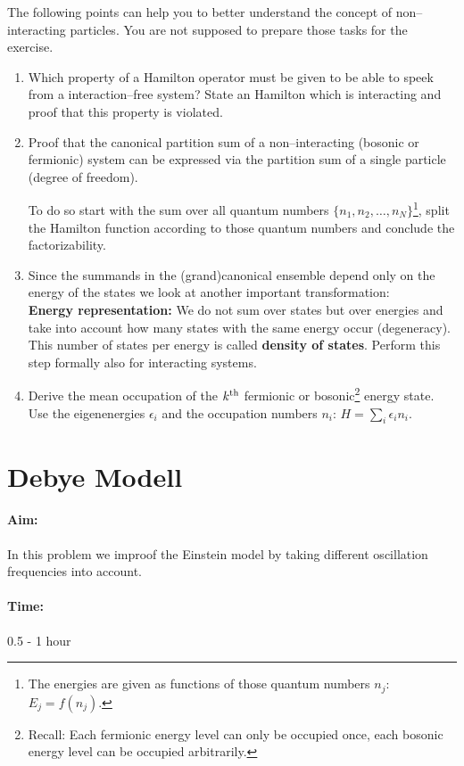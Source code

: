 \documentclass[12pt,a4paper]{article} %
\begin{document}
 The following points can help you to better understand the concept of non--interacting particles. You are not supposed to prepare those tasks for the exercise.
 \begin{enumerate}
 \item Which property of a Hamilton operator must be given to be able to speek from a interaction--free system? State an Hamilton which is interacting and proof that this property is violated.
 \item Proof that the canonical partition sum of a non--interacting (bosonic or fermionic) system can be expressed via the partition sum of a single particle (degree of freedom). 
 
 To do so start with the sum over all quantum numbers $\{n_1, n_2, \dots, n_N\}$\footnote{The energies are given as functions of those quantum numbers $n_j$: $E_j = f(n_j)$.}, split the Hamilton function according to those quantum numbers and conclude the factorizability.
 
 \item Since the summands in the (grand)canonical ensemble depend only on the energy of the states we look at another important transformation:\\
 \textbf{Energy representation:}
 We do not sum over states but over energies and take into account how many states with the same energy occur (degeneracy). This number of states per energy is called \textbf{density of states}. Perform this step formally also for interacting systems.
 
  \item Derive the mean occupation of the $k^{\textnormal{th}}$ fermionic or bosonic\footnote{Recall: Each fermionic energy level can only be occupied once, each bosonic energy level can be occupied arbitrarily.} energy state. Use the eigenenergies $\epsilon_i$ and the occupation numbers $n_i$: $H = \sum_i \epsilon_i n_i$.
  \end{enumerate}


 \section{Debye Modell}
 \paragraph{Aim:} In this problem we improof the Einstein model by taking different oscillation frequencies into account. 
 \paragraph{Time:} 0.5 - 1 hour
 
\end{document}
